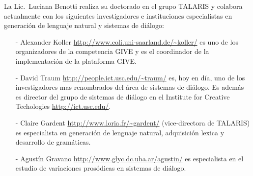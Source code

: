 La Lic.\ Luciana Benotti realiza su doctorado en el
grupo TALARIS y colabora actualmente con los siguientes investigadores e
instituciones
especialistas en generaci\'on de lenguaje natural y sistemas de di\'alogo:
\begin{itemize}
    \item[-]  Alexander Koller \url{http://www.coli.uni-saarland.de/~koller/} es
uno de los organizadores 
de la competencia GIVE y es el coordinador de la implementaci\'on de la
plataforma GIVE.
    \item[-] David Traum \url{http://people.ict.usc.edu/~traum/} es, hoy en
d\'ia, uno
de los investigadores mas renombrados del \'area de sistemas de di\'alogo.
Es adem\'as es director del grupo de sistemas de di\'alogo en el Institute
for Creative Techologies \url{http://ict.usc.edu/}.
\item[-] Claire Gardent \url{http://www.loria.fr/~gardent/} (vice-directora de
TALARIS) es especialista en generaci\'on de lenguaje natural, adquisici\'on
lexica y desarrollo de gram\'aticas.
\item[-] Agust\'in Gravano \url{http://www.glyc.dc.uba.ar/agustin/} es
especialista
en el estudio de varia\-ciones pros\'odicas en sistemas de di\'alogo.
\end{itemize}